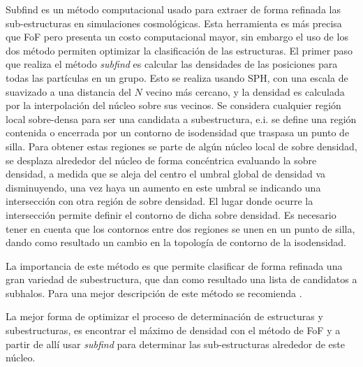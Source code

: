 Subfind es un método computacional usado para extraer de forma refinada las sub-estructuras en simulaciones cosmológicas. Esta herramienta es más precisa que FoF pero presenta un costo computacional mayor, sin embargo el uso de los dos método permiten optimizar la clasificación de las estructuras. El primer paso que realiza el método {\it{subfind}} es calcular las densidades de las posiciones para todas las partículas en un grupo. Esto se realiza usando SPH, con una escala de suavizado a una distancia del $N$ vecino más cercano, y la densidad es calculada por la interpolación del núcleo sobre sus vecinos. Se considera cualquier región local sobre-densa para ser una candidata a subestructura, e.i. se define una región contenida o encerrada por un contorno de isodensidad que traspasa un punto de silla. Para obtener estas regiones se parte de algún núcleo local de sobre densidad, se desplaza alrededor del núcleo de forma concéntrica evaluando la sobre densidad, a medida que se aleja del centro el umbral global de densidad va disminuyendo, una vez haya un aumento en este umbral  se indicando una intersección con otra región de sobre densidad. El lugar donde ocurre la intersección permite definir el contorno de dicha sobre densidad. Es necesario tener en cuenta que los contornos entre dos regiones se unen en un punto de silla, dando como resultado un cambio en la topología de contorno de la isodensidad.

La importancia de este método es que permite clasificar de forma  refinada una gran variedad de subestructura, que dan como resultado una lista de candidatos a subhalos. Para una mejor descripción de este método se recomienda \cite{springel2018}.

La mejor forma de optimizar el proceso de determinación de estructuras y subestructuras, es encontrar el máximo de densidad con el método de FoF y a partir de allí usar {\it{subfind}} para determinar las sub-estructuras alrededor de este núcleo.





